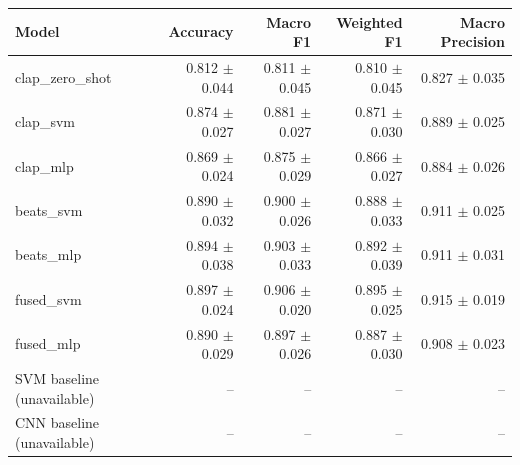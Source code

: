 \begin{tabular}{lrrrr}
Model & Accuracy & Macro F1 & Weighted F1 & Macro Precision \\
\hline
clap\_zero\_shot & 0.812 $\pm$ 0.044 & 0.811 $\pm$ 0.045 & 0.810 $\pm$ 0.045 & 0.827 $\pm$ 0.035 \\
clap\_svm & 0.874 $\pm$ 0.027 & 0.881 $\pm$ 0.027 & 0.871 $\pm$ 0.030 & 0.889 $\pm$ 0.025 \\
clap\_mlp & 0.869 $\pm$ 0.024 & 0.875 $\pm$ 0.029 & 0.866 $\pm$ 0.027 & 0.884 $\pm$ 0.026 \\
beats\_svm & 0.890 $\pm$ 0.032 & 0.900 $\pm$ 0.026 & 0.888 $\pm$ 0.033 & 0.911 $\pm$ 0.025 \\
beats\_mlp & 0.894 $\pm$ 0.038 & 0.903 $\pm$ 0.033 & 0.892 $\pm$ 0.039 & 0.911 $\pm$ 0.031 \\
fused\_svm & 0.897 $\pm$ 0.024 & 0.906 $\pm$ 0.020 & 0.895 $\pm$ 0.025 & 0.915 $\pm$ 0.019 \\
fused\_mlp & 0.890 $\pm$ 0.029 & 0.897 $\pm$ 0.026 & 0.887 $\pm$ 0.030 & 0.908 $\pm$ 0.023 \\
SVM baseline (unavailable) & -- & -- & -- & -- \\
CNN baseline (unavailable) & -- & -- & -- & -- \\
\end{tabular}
